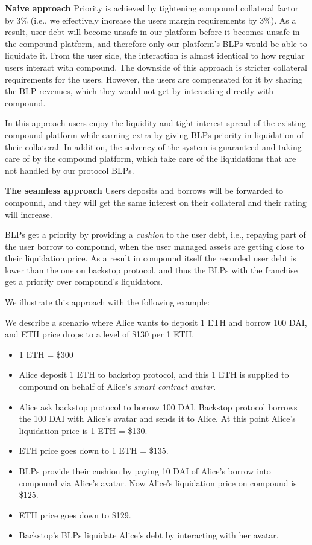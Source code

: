 \documentclass{article}
\begin{document}
\noindent\textbf{Naive approach}
Priority is achieved by tightening compound collateral factor by 3\% (i.e., we effectively increase the users margin requirements by 3\%).
As a result, user debt will become unsafe in our platform before it becomes unsafe in the compound platform, and therefore only our platform's BLPs would be able to liquidate it.
From the user side, the interaction is almost identical to how regular users interact with compound.
The downside of this approach is stricter collateral requirements for the users. However, the users are compensated for it by sharing the BLP revenues, which they would not get by interacting directly with compound.

In this approach users enjoy the liquidity and tight interest spread of the existing compound platform while earning extra by giving BLPs priority in liquidation of their collateral.
In addition, the solvency of the system is guaranteed and taking care of by the compound platform, which take care of the liquidations that are not handled by our protocol BLPs.

\noindent\textbf{The seamless approach}
Users deposits and borrows will be forwarded to compound, and they will get the same interest on their collateral and their rating will increase.

BLPs get a priority by providing a \emph{cushion} to the user debt, i.e., repaying part of the user borrow to compound, when the user managed assets are getting close to their liquidation price.
As a result in compound itself the recorded user debt is lower than the one on backstop protocol, and thus the BLPs with the franchise get a priority over compound's liquidators.

We illustrate this approach with the following example:
\begin{example}
We describe a scenario where Alice wants to deposit 1 ETH and borrow 100 DAI, and ETH price drops to a level of \$130 per 1 ETH.
\begin{itemize}
    \item 1 ETH = \$300
    \item Alice deposit 1 ETH to backstop protocol, and this 1 ETH is supplied to compound on behalf of Alice's \emph{smart contract avatar}.
    \item Alice ask backstop protocol to borrow 100 DAI. Backstop protocol borrows the 100 DAI with Alice's avatar and sends it to Alice. At this point Alice's liquidation price is 1 ETH = \$130.
    \item ETH price goes down to 1 ETH = \$135.
    \item BLPs provide their cushion by paying 10 DAI of Alice's borrow into compound via Alice's avatar. Now Alice's liquidation price on compound is \$125.
    \item ETH price goes down to \$129.
    \item Backstop's BLPs liquidate Alice's debt by interacting with her avatar.
\end{itemize}
\end{example}
\end{document}
